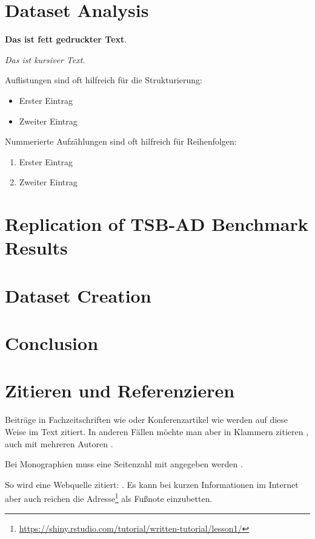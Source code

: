 \documentclass[12pt,oneside]{article}
\begin{document}
\section{Dataset Analysis}

\textbf{Das ist fett gedruckter Text}.

\textit{Das ist kursiver Text}.


Auflistungen sind oft hilfreich für die Strukturierung:
\begin{itemize}
    \item Erster Eintrag
    \item Zweiter Eintrag
\end{itemize}

Nummerierte Aufzählungen sind oft hilfreich für Reihenfolgen:
\begin{enumerate}
    \item Erster Eintrag
    \item Zweiter Eintrag
\end{enumerate}

\section{Replication of TSB-AD Benchmark Results}

\section{Dataset Creation}

\section{Conclusion}

\section{Zitieren und Referenzieren}

Beiträge in Fachzeitschriften wie \citet{clemen1989combining} oder Konferenzartikel wie \citet{he2017mask} werden auf diese Weise im Text zitiert. In anderen Fällen möchte man aber in Klammern zitieren \citep{clemen1989combining}, auch mit mehreren Autoren \citep{clemen1989combining,baumol1958warehouse,he2017mask}.

Bei Monographien muss eine Seitenzahl mit angegeben werden \citep[S. 28]{chollet2018deep}.

So wird eine Webquelle zitiert: \citet{shiny1}. Es kann bei kurzen Informationen im Internet aber auch reichen die Adresse\footnote{\url{https://shiny.rstudio.com/tutorial/written-tutorial/lesson1/}} als Fußnote einzubetten.
\end{document}
